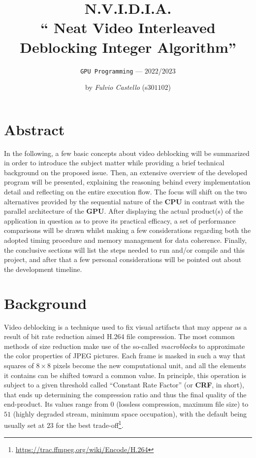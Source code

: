 \documentclass{article}
\title{%
\textsf{%
    \textbf{\textcolor{NvidiaGreen}{N.V.I.D.I.A.\\}}}%
    \large{\textsf{\textbf{``%
    \textcolor{NvidiaGreen}{N}eat %
    \textcolor{NvidiaGreen}{V}ideo %
    \textcolor{NvidiaGreen}{I}nterleaved %
    \textcolor{NvidiaGreen}{D}eblocking %
    \textcolor{NvidiaGreen}{I}nteger %
    \textcolor{NvidiaGreen}{A}lgorithm''}}}%
}
\author{\texttt{GPU Programming} --- $2022$/$2023$}
\date{by \textit{Fulvio Castello} (s$301102$)}
\begin{document}
\maketitle

\section*{Abstract}
In the following, a few basic concepts about video deblocking will be summarized in order to introduce the subject matter while providing a brief technical background on the proposed issue. Then, an extensive overview of the developed program will be presented, explaining the reasoning behind every implementation detail and reflecting on the entire execution flow. The focus will shift on the two alternatives provided by the sequential nature of the \textbf{CPU} in contrast with the parallel architecture of the \textbf{GPU}. After displaying the actual product(s) of the application in question as to prove its practical efficacy, a set of performance comparisons will be drawn whilst making a few considerations regarding both the adopted timing procedure and memory management for data coherence. Finally, the conclusive sections will list the steps needed to run and/or compile and this project, and after that a few personal considerations will be pointed out about the development timeline.

\section{Background}
Video deblocking is a technique used to fix visual artifacts that may appear as a result of bit rate reduction aimed H.$264$ file compression. The most common methods of size reduction make use of the so-called \textit{macroblocks} to approximate the color properties of JPEG pictures. Each frame is masked in such a way that squares of $8\times 8$ pixels become the new computational unit, and all the elements it contains can be shifted toward a common value. In principle, this operation is subject to a given threshold called ``Constant Rate Factor'' (or \textbf{CRF}, in short), that ends up determining the compression ratio and thus the final quality of the end-product. Its values range from $0$ (lossless compression, maximum file size) to $51$ (highly degraded stream, minimum space occupation), with the default being usually set at $23$ for the best trade-off\footnote{\url{https://trac.ffmpeg.org/wiki/Encode/H.264}}.
\end{document}

